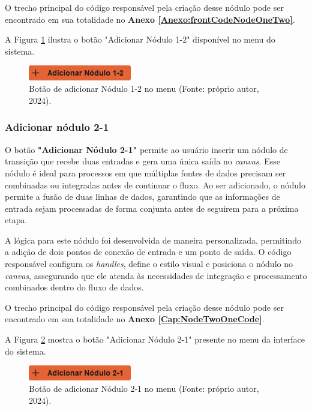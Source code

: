 O trecho principal do código responsável pela criação desse nódulo pode ser encontrado em sua totalidade no \textbf{Anexo \ref{Anexo:frontCodeNodeOneTwo}}.

A Figura \ref{Fig:AddNodeOneTwoButton} ilustra o botão "Adicionar Nódulo 1-2" disponível no menu do sistema.

\begin{figure}[htbp]
    \centering
    \includegraphics[width=0.4\textwidth]{figuras/add-node12-button.png}
    \caption{Botão de adicionar Nódulo 1-2 no menu (Fonte: próprio autor, 2024).}
    \label{Fig:AddNodeOneTwoButton}
\end{figure}

\subsubsection{Adicionar nódulo 2-1}

O botão \textbf{"Adicionar Nódulo 2-1"} permite ao usuário inserir um nódulo de transição que recebe duas entradas e gera uma única saída no \textit{canvas}. Esse nódulo é ideal para processos em que múltiplas fontes de dados precisam ser combinadas ou integradas antes de continuar o fluxo. Ao ser adicionado, o nódulo permite a fusão de duas linhas de dados, garantindo que as informações de entrada sejam processadas de forma conjunta antes de seguirem para a próxima etapa.

A lógica para este nódulo foi desenvolvida de maneira personalizada, permitindo a adição de dois pontos de conexão de entrada e um ponto de saída. O código responsável configura os \textit{handles}, define o estilo visual e posiciona o nódulo no \textit{canvas}, assegurando que ele atenda às necessidades de integração e processamento combinados dentro do fluxo de dados.

O trecho principal do código responsável pela criação desse nódulo pode ser encontrado em sua totalidade no \textbf{Anexo \ref{Cap:NodeTwoOneCode}}.

A Figura \ref{Fig:AddNodeTwoOneButton} mostra o botão "Adicionar Nódulo 2-1" presente no menu da interface do sistema.

\begin{figure}[htbp]
    \centering
    \includegraphics[width=0.4\textwidth]{figuras/add-node21-button.png}
    \caption{Botão de adicionar Nódulo 2-1 no menu (Fonte: próprio autor, 2024).}
    \label{Fig:AddNodeTwoOneButton}
\end{figure}

